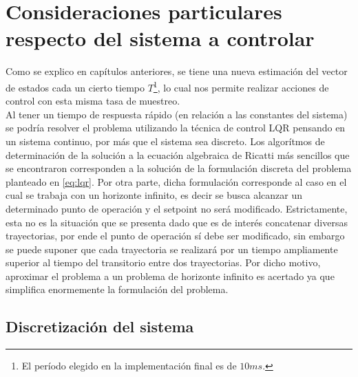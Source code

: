 \documentclass[main]{subfiles}
\begin{document}
\section{Consideraciones particulares respecto del sistema a controlar}

Como se explico en cap\'itulos anteriores, se tiene una nueva estimaci\'on del vector de estados cada un cierto tiempo $T$\footnote{El per\'iodo elegido en la implementaci\'on final es de $10ms$.}, lo cual nos permite realizar acciones de control con esta misma tasa de muestreo. \\

Al tener un tiempo de respuesta r\'apido (en relaci\'on a las constantes del sistema) se podr\'ia resolver el problema utilizando la t\'ecnica de control LQR pensando en un sistema continuo, por m\'as que el sistema sea discreto. Los algor\'itmos de determinaci\'on de la soluci\'on a la ecuaci\'on algebraica de Ricatti m\'as sencillos que se encontraron corresponden a la soluci\'on de la formulaci\'on discreta del problema planteado en \ref{eq:lqr}. Por otra parte, dicha formulaci\'on corresponde al caso en el cual se trabaja con un horizonte infinito, es decir se busca alcanzar un determinado punto de operaci\'on y el setpoint no ser\'a modificado. Estrictamente, esta no es la situaci\'on que se presenta dado que es de inter\'es concatenar diversas trayectorias, por ende el punto de operaci\'on s\'i debe ser modificado, sin embargo se puede suponer que cada trayectoria se realizar\'a por un tiempo ampliamente superior al tiempo del transitorio entre dos trayectorias. Por dicho motivo, aproximar el problema a un problema de horizonte infinito es acertado ya que simplifica enormemente la formulaci\'on del problema.

\subsection{Discretizaci\'on del sistema}
\end{document}
